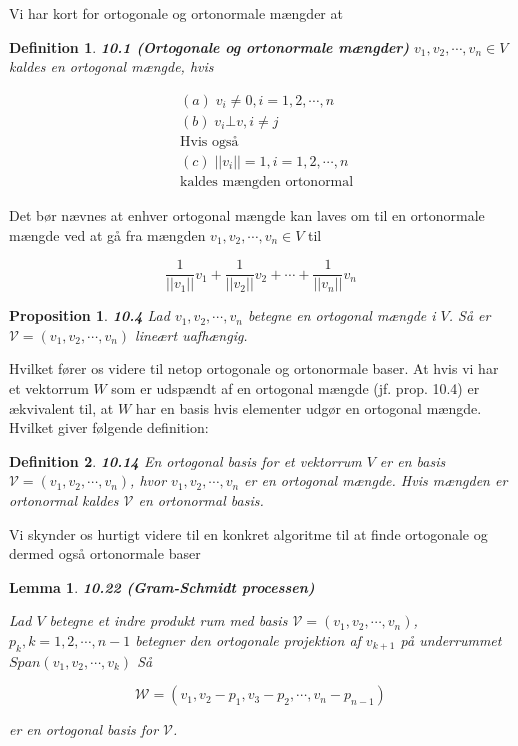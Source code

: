 \documentclass[paper=a4, fontsize=11pt]{scrartcl} %
\newtheorem*{lemma}{Lemma}
\newtheorem*{definition}{Definition}
\newtheorem*{proposition}{Proposition}
\newenvironment{cstmproposition}[1]{\begin{proposition} {\normalfont\textbf{#1}}}{\end{proposition}}
\newenvironment{cstmlemma}[1]{\begin{lemma} {\normalfont\textbf{#1}}}{\end{lemma}}
\newenvironment{cstmdefinition}[1]{\begin{definition} {\normalfont\textbf{#1}}}{\end{definition}}
\begin{document}
			
			
			Vi har kort for ortogonale og ortonormale mængder at 
			
			\begin{cstmdefinition}{10.1 (Ortogonale og ortonormale mængder)}
				$v_1,v_2,\cdots,v_n \in V$ kaldes en ortogonal mængde, hvis
				
				\begin{align*}
				&(a) \; v_i \not = 0, i = 1,2,\cdots,n\\
				&(b) \; v_i \bot v, i \not = j\\
				&\text{Hvis også}\\
				&(c) \; ||v_i|| = 1, i = 1,2,\cdots,n\\
				&\text{kaldes mængden ortonormal}
				\end{align*}
				
			\end{cstmdefinition}
			
			Det bør nævnes at enhver ortogonal mængde kan laves om til en ortonormale mængde ved at gå fra mængden $v_1,v_2,\cdots,v_n \in V$ til
			
			\[\frac{1}{||v_1||}v_1 + \frac{1}{||v_2||}v_2 + \cdots + \frac{1}{||v_n||}v_n\]
			
			\begin{cstmproposition}{10.4}
				Lad $v_1,v_2,\cdots,v_n$ betegne en ortogonal mængde i $V$. Så er $\mathcal{V} = (v_1,v_2,\cdots,v_n)$ lineært uafhængig.
				
				
			\end{cstmproposition}
			
			Hvilket fører os videre til netop ortogonale og ortonormale baser. At hvis vi har et vektorrum $W$ som er udspændt af en ortogonal mængde (jf. prop. 10.4) er ækvivalent til, at $W$ har en basis hvis elementer udgør en ortogonal mængde. Hvilket giver følgende definition:
			
			\begin{cstmdefinition}{10.14}
				En ortogonal basis for et vektorrum $V$ er en basis $\mathcal{V} = (v_1,v_2,\cdots,v_n)$, hvor $v_1,v_2,\cdots,v_n$ er en ortogonal mængde. Hvis mængden er ortonormal kaldes $\mathcal{V}$ en ortonormal basis.
				
			\end{cstmdefinition}
			
			Vi skynder os hurtigt videre til en konkret algoritme til at finde ortogonale og dermed også ortonormale baser
			
			\begin{cstmlemma}{10.22 (Gram-Schmidt processen)}
				
				Lad $V$ betegne et indre produkt rum med basis $\mathcal{V} = (v_1,v_2,\cdots,v_n)$, $p_k, k = 1,2,\cdots,n-1$ betegner den ortogonale projektion af $v_{k+1}$ på underrummet $Span(v_1,v_2,\cdots,v_k)$ Så
				
				\[\mathcal{W} = (v_1,v_2 - p_1,v_3 - p_2,\cdots, v_n - p_{n-1}) \tag{10.17}\]
				
				er en ortogonal basis for $\mathcal{V}$.
				
			\end{cstmlemma}
			
\end{document}

